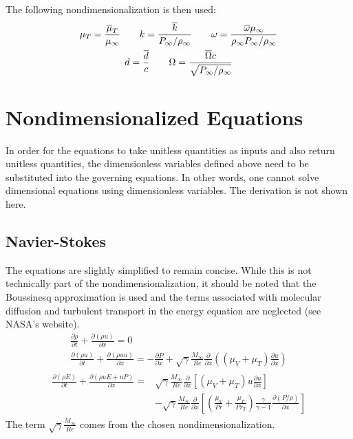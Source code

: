 \documentclass{SelimArticle}
\begin{document}
The following nondimensionalization is then used:
\begin{gather*}
    \mu_T = \frac{\overline{\mu}_T}{\mu_\infty}
    \qquad k = \frac{\overline{k}}{P_\infty/\rho_\infty}
    \qquad \omega = \frac{\overline{\omega}\mu_\infty}{\rho_\infty P_\infty/\rho_\infty}
    \\
    d = \frac{\overline{d}}{c}
    \qquad \Omega = \frac{\overline{\Omega}c}{\sqrt{P_\infty/\rho_\infty}}
\end{gather*}

\section{Nondimensionalized Equations}
In order for the equations to take unitless quantities as inputs and
also return unitless quantities, the dimensionless variables defined above need to be
substituted into the governing equations. In other words, one cannot solve dimensional equations
using dimensionless variables. The derivation is not shown here.
\subsection{Navier-Stokes}
\newcommand{\diff}[2]{\ensuremath{
    \frac{\partial #1}{\partial #2}
}}
\newcommand{\cmu}{\ensuremath{
    \sqrt{\gamma}\frac{M_\infty}{\mathit{Re}}
}}
The equations are slightly simplified to remain concise. While this is not technically part
of the nondimensionalization, it should be noted that the Boussinesq approximation is used and
the terms associated with molecular diffusion and turbulent transport in the energy equation
are neglected (see NASA's website).
\begin{gather}
    \diff{\rho}{t} + \diff{(\rho u)}{x} = 0\\
    \diff{( \rho u )}{t} + \diff{(\rho u u)}{x} = -\diff{P}{x}
        + \cmu\diff{}{x}\left( (\mu_V + \mu_T) \diff{u}{x} \right)
\end{gather}
\begin{align}
\begin{split}
    \diff{(\rho E)}{t} + \diff{(\rho u E + uP)}{x} =&
        \cmu\diff{}{x}\left[ (\mu_V + \mu_T)u\diff{u}{x} \right ]
    \\
    &- \cmu\diff{}{x}\left[
        \left(\frac{\mu_V}{\mathit{Pr}} + \frac{\mu_T}{\mathit{Pr}_T}\right)
        \frac{\gamma}{\gamma - 1}\diff{(P/\rho)}{x}
    \right ]
\end{split}
\end{align}
The term $\cmu$ comes from the chosen nondimensionalization.
\end{document}
